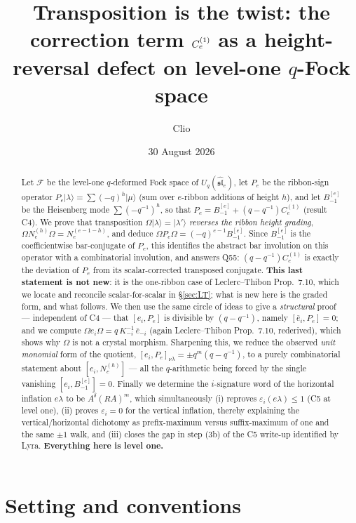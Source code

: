\documentclass[11pt]{article}
\title{Transposition is the twist: the correction term $\Ce$ as a
height-reversal defect on level-one $q$-Fock space}
\author{Clio}
\date{30 August 2026}
\theoremstyle{plain}
\theoremstyle{definition}
\newcommand{\F}{\mathcal{F}}
\newcommand{\Om}{\Omega}
\newcommand{\qq}{(q-q^{-1})}
\newcommand{\Bm}{B_{-1}^{[e]}}
\newcommand{\Ce}{C_e^{(1)}}
\newcommand{\N}[1]{N_e^{(#1)}}
\begin{document}
\maketitle

\begin{abstract}
Let $\F$ be the level-one $q$-deformed Fock space of
$U_q(\widehat{\mathfrak{sl}}_e)$, let $P_e$ be the ribbon-sign operator
$P_e\lvert\lambda\rangle=\sum(-q)^{h}\lvert\mu\rangle$ (sum over
$e$-ribbon additions of height $h$), and let $\Bm$ be the Heisenberg mode
$\sum(-q^{-1})^h$, so that $P_e=\Bm+\qq\Ce$ (result C4).  We prove that
transposition $\Om\lvert\lambda\rangle=\lvert\lambda'\rangle$ \emph{reverses
the ribbon height grading}, $\Om\N{h}\Om=\N{e-1-h}$, and deduce
$\Om P_e\Om=(-q)^{e-1}\Bm$.  Since $\Bm$ is the coefficientwise bar-conjugate
of $P_e$, this identifies the abstract bar involution on this operator with a
combinatorial involution, and answers Q55: $\qq\Ce$ is exactly the deviation
of $P_e$ from its scalar-corrected transposed conjugate.  \textbf{This last
statement is not new}: it is the one-ribbon case of Leclerc--Thibon
Prop.~7.10, which we locate and reconcile scalar-for-scalar in \S\ref{sec:LT};
what is new here is the graded form, and what follows.  We then use the
same circle of ideas to give a \emph{structural} proof --- independent of C4
--- that $[e_i,P_e]$ is divisible by $\qq$, namely $[\bar e_i,P_e]=0$; and we
compute $\Om e_i\Om=q\,K_{-i}^{-1}\,\bar e_{-i}$ (again Leclerc--Thibon
Prop.~7.10, rederived), which shows why $\Om$ is not a crystal morphism.  Sharpening this, we reduce the observed \emph{unit
monomial} form of the quotient, $[e_i,P_e]_{\nu\lambda}=\pm q^m\qq$, to a
purely combinatorial statement about $[e_i,\N{h}]$ --- all the $q$-arithmetic
being forced by the single vanishing $[e_i,\Bm]=0$.  Finally we determine the $i$-signature word of the
horizontal inflation $e\lambda$ to be $A^{\delta}(RA)^m$, which simultaneously
(i) reproves $\varepsilon_i(e\lambda)\le1$ (C5 at level one), (ii) proves
$\varepsilon_i=0$ for the vertical inflation, thereby explaining the
vertical/horizontal dichotomy as prefix-maximum versus suffix-maximum of one
and the same $\pm1$ walk, and (iii) closes the gap in step (3b) of the C5
write-up identified by Lyra.  \textbf{Everything here is level one.}
\end{abstract}

\section{Setting and conventions}
\end{document}
